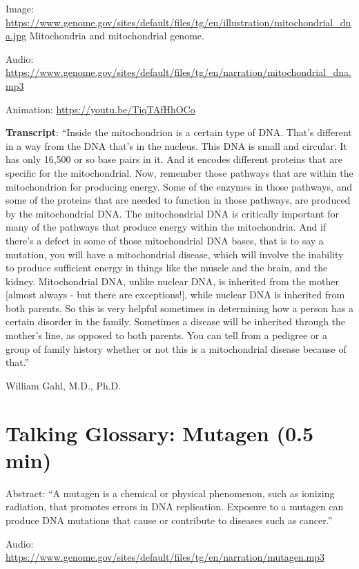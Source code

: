 \documentclass[
]{book}
\begin{document}
Image: \url{https://www.genome.gov/sites/default/files/tg/en/illustration/mitochondrial_dna.jpg}
Mitochondria and mitochondrial genome.

Audio: \url{https://www.genome.gov/sites/default/files/tg/en/narration/mitochondrial_dna.mp3}

Animation: \url{https://youtu.be/TiqTAfHhOCo}

\textbf{Transcript}: ``Inside the mitochondrion is a certain type of DNA. That's different in a way from the DNA that's in the nucleus. This DNA is small and circular. It has only 16,500 or so base pairs in it. And it encodes different proteins that are specific for the mitochondrial. Now, remember those pathways that are within the mitochondrion for producing energy. Some of the enzymes in those pathways, and some of the proteins that are needed to function in those pathways, are produced by the mitochondrial DNA. The mitochondrial DNA is critically important for many of the pathways that produce energy within the mitochondria. And if there's a defect in some of those mitochondrial DNA bases, that is to say a mutation, you will have a mitochondrial disease, which will involve the inability to produce sufficient energy in things like the muscle and the brain, and the kidney. Mitochondrial DNA, unlike nuclear DNA, is inherited from the mother {[}almost always - but there are exceptions!{]}, while nuclear DNA is inherited from both parents. So this is very helpful sometimes in determining how a person has a certain disorder in the family. Sometimes a disease will be inherited through the mother's line, as opposed to both parents. You can tell from a pedigree or a group of family history whether or not this is a mitochondrial disease because of that.''

William Gahl, M.D., Ph.D.

\hypertarget{talking-glossary-mutagen-0.5-min}{%
\section{Talking Glossary: Mutagen (0.5 min)}\label{talking-glossary-mutagen-0.5-min}}

Abstract: ``A mutagen is a chemical or physical phenomenon, such as ionizing radiation, that promotes errors in DNA replication. Exposure to a mutagen can produce DNA mutations that cause or contribute to diseases such as cancer.''

Audio: \url{https://www.genome.gov/sites/default/files/tg/en/narration/mutagen.mp3}
\end{document}
